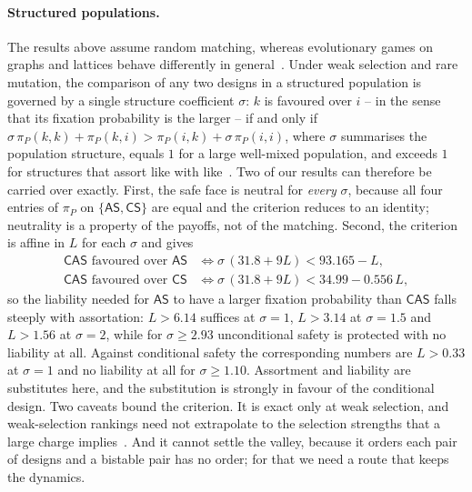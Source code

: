 \documentclass[11pt,a4paper]{article}
\theoremstyle{definition}
\newcommand{\AS}{\textsf{AS}}
\newcommand{\CS}{\textsf{CS}}
\newcommand{\CAS}{\textsf{CAS}}
\newcommand{\piP}{\pi_{P}}
\begin{document}
\paragraph{Structured populations.}
The results above assume random matching, whereas evolutionary games on graphs
and lattices behave differently in
general~\citep{szabo2007graphs,perc2017statistical}. Under weak selection and
rare
mutation, the comparison of any two designs in a structured population is
governed by a single structure coefficient $\sigma$: $k$ is favoured over
$i$ -- in the sense that its fixation probability is the larger -- if and only
if
$\sigma\,\piP(k,k)+\piP(k,i)>\piP(i,k)+\sigma\,\piP(i,i)$, where $\sigma$
summarises the population structure, equals $1$ for a large well-mixed
population, and exceeds $1$ for structures that assort like with
like~\citep{tarnita2009strategy}. Two of our results can therefore be
carried over exactly. First, the safe face is neutral for \emph{every}
$\sigma$, because all four entries of $\piP$ on $\{\AS,\CS\}$ are equal and
the criterion reduces to an identity; neutrality is a property of the payoffs,
not of the matching. Second, the criterion is affine in $L$ for each $\sigma$
and gives
\begin{equation}
\begin{aligned}
\CAS \text{ favoured over } \AS &\iff \sigma\,(31.8+9L)<93.165-L,\\
\CAS \text{ favoured over } \CS &\iff \sigma\,(31.8+9L)<34.99-0.556\,L,
\end{aligned}
\label{eq:sigma}
\end{equation}
so the liability needed for $\AS$ to have a larger fixation probability than
$\CAS$ falls steeply with assortation: $L>6.14$ suffices at $\sigma=1$,
$L>3.14$ at $\sigma=1.5$ and $L>1.56$ at $\sigma=2$, while for
$\sigma\ge2.93$ unconditional safety is protected with no liability at all.
Against conditional safety the corresponding numbers are $L>0.33$ at
$\sigma=1$ and no liability at all for $\sigma\ge1.10$. Assortment and
liability are substitutes here, and the substitution is strongly in favour of
the conditional design. Two caveats bound the criterion. It is exact only at
weak selection, and weak-selection rankings need not extrapolate to the
selection strengths that a large charge implies~\citep{wu2013extrapolating}.
And it cannot settle the valley, because it orders each pair of designs and a
bistable pair has no order; for that we need a route that keeps the dynamics.
\end{document}
